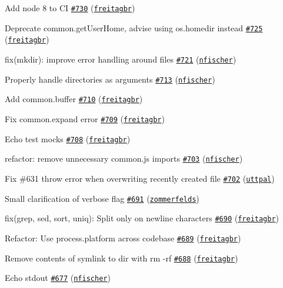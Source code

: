\begin{DoxyItemize}
\item Add node 8 to CI \href{https://github.com/shelljs/shelljs/pull/730}{\tt \#730} (\href{https://github.com/freitagbr}{\tt freitagbr})
\item Deprecate common.\+get\+User\+Home, advise using os.\+homedir instead \href{https://github.com/shelljs/shelljs/pull/725}{\tt \#725} (\href{https://github.com/freitagbr}{\tt freitagbr})
\item fix(mkdir)\+: improve error handling around files \href{https://github.com/shelljs/shelljs/pull/721}{\tt \#721} (\href{https://github.com/nfischer}{\tt nfischer})
\item Properly handle directories as arguments \href{https://github.com/shelljs/shelljs/pull/713}{\tt \#713} (\href{https://github.com/nfischer}{\tt nfischer})
\item Add common.\+buffer \href{https://github.com/shelljs/shelljs/pull/710}{\tt \#710} (\href{https://github.com/freitagbr}{\tt freitagbr})
\item Fix common.\+expand error \href{https://github.com/shelljs/shelljs/pull/709}{\tt \#709} (\href{https://github.com/freitagbr}{\tt freitagbr})
\item Echo test mocks \href{https://github.com/shelljs/shelljs/pull/708}{\tt \#708} (\href{https://github.com/freitagbr}{\tt freitagbr})
\item refactor\+: remove unnecessary common.\+js imports \href{https://github.com/shelljs/shelljs/pull/703}{\tt \#703} (\href{https://github.com/nfischer}{\tt nfischer})
\item Fix \#631 throw error when overwriting recently created file \href{https://github.com/shelljs/shelljs/pull/702}{\tt \#702} (\href{https://github.com/uttpal}{\tt uttpal})
\item Small clarification of verbose flag \href{https://github.com/shelljs/shelljs/pull/691}{\tt \#691} (\href{https://github.com/zommerfelds}{\tt zommerfelds})
\item fix(grep, sed, sort, uniq)\+: Split only on newline characters \href{https://github.com/shelljs/shelljs/pull/690}{\tt \#690} (\href{https://github.com/freitagbr}{\tt freitagbr})
\item Refactor\+: Use process.\+platform across codebase \href{https://github.com/shelljs/shelljs/pull/689}{\tt \#689} (\href{https://github.com/freitagbr}{\tt freitagbr})
\item Remove contents of symlink to dir with rm -\/rf \href{https://github.com/shelljs/shelljs/pull/688}{\tt \#688} (\href{https://github.com/freitagbr}{\tt freitagbr})
\item Echo stdout \href{https://github.com/shelljs/shelljs/pull/677}{\tt \#677} (\href{https://github.com/nfischer}{\tt nfischer})
\end{DoxyItemize}

